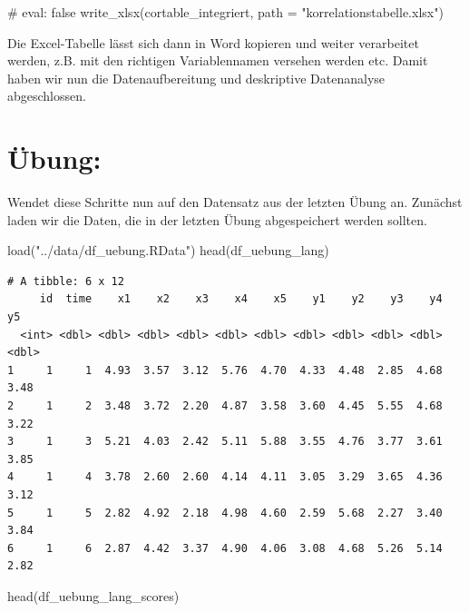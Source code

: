 \documentclass[
  letterpaper,
  DIV=11,
  numbers=noendperiod]{scrreprt}
\newenvironment{Shaded}{\begin{snugshade}}{\end{snugshade}}
\newcommand{\AttributeTok}[1]{\textcolor[rgb]{0.40,0.45,0.13}{#1}}
\newcommand{\CommentTok}[1]{\textcolor[rgb]{0.37,0.37,0.37}{#1}}
\newcommand{\FunctionTok}[1]{\textcolor[rgb]{0.28,0.35,0.67}{#1}}
\newcommand{\NormalTok}[1]{\textcolor[rgb]{0.00,0.23,0.31}{#1}}
\newcommand{\StringTok}[1]{\textcolor[rgb]{0.13,0.47,0.30}{#1}}
\begin{document}
\begin{Shaded}
\begin{Highlighting}[]
\CommentTok{\# eval: false}
\FunctionTok{write\_xlsx}\NormalTok{(cortable\_integriert, }\AttributeTok{path =} \StringTok{"korrelationstabelle.xlsx"}\NormalTok{)}
\end{Highlighting}
\end{Shaded}

Die Excel-Tabelle lässt sich dann in Word kopieren und weiter
verarbeitet werden, z.B. mit den richtigen Variablennamen versehen
werden etc. Damit haben wir nun die Datenaufbereitung und deskriptive
Datenanalyse abgeschlossen.


\chapter{Übung:}\label{uxfcbung}

Wendet diese Schritte nun auf den Datensatz aus der letzten Übung an.
Zunächst laden wir die Daten, die in der letzten Übung abgespeichert
werden sollten.

\begin{Shaded}
\begin{Highlighting}[]
\FunctionTok{load}\NormalTok{(}\StringTok{"../data/df\_uebung.RData"}\NormalTok{)}
\FunctionTok{head}\NormalTok{(df\_uebung\_lang)}
\end{Highlighting}
\end{Shaded}

\begin{verbatim}
# A tibble: 6 x 12
     id  time    x1    x2    x3    x4    x5    y1    y2    y3    y4    y5
  <int> <dbl> <dbl> <dbl> <dbl> <dbl> <dbl> <dbl> <dbl> <dbl> <dbl> <dbl>
1     1     1  4.93  3.57  3.12  5.76  4.70  4.33  4.48  2.85  4.68  3.48
2     1     2  3.48  3.72  2.20  4.87  3.58  3.60  4.45  5.55  4.68  3.22
3     1     3  5.21  4.03  2.42  5.11  5.88  3.55  4.76  3.77  3.61  3.85
4     1     4  3.78  2.60  2.60  4.14  4.11  3.05  3.29  3.65  4.36  3.12
5     1     5  2.82  4.92  2.18  4.98  4.60  2.59  5.68  2.27  3.40  3.84
6     1     6  2.87  4.42  3.37  4.90  4.06  3.08  4.68  5.26  5.14  2.82
\end{verbatim}

\begin{Shaded}
\begin{Highlighting}[]
\FunctionTok{head}\NormalTok{(df\_uebung\_lang\_scores)}
\end{Highlighting}
\end{Shaded}
\end{document}
